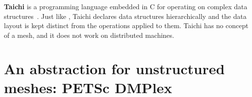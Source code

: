 \documentclass[thesis]{subfiles}
\begin{document}





\textbf{Taichi} is a programming language embedded in C\+\+ for operating on complex data structures~\cite{huTaichiLanguageHighperformance2019}.
Just like , Taichi declares data structures hierarchically and the data layout is kept distinct from the operations applied to them.
Taichi has no concept of a mesh, and it does not work on distributed machines.


\section{An abstraction for unstructured meshes: PETSc DMPlex}

\end{document}
